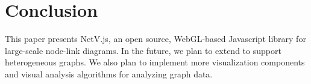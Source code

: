 \section{Conclusion}
This paper presents NetV.js, an open source, WebGL-based Javascript library for large-scale node-link diagrams. In the future, we plan to extend \name to support heterogeneous graphs. We also plan to implement more visualization components and visual analysis algorithms for analyzing graph data.